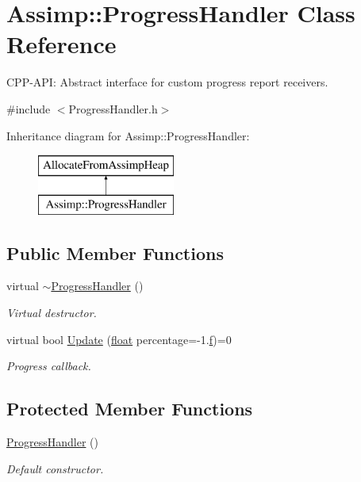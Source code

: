 \hypertarget{class_assimp_1_1_progress_handler}{\section{Assimp\-:\-:Progress\-Handler Class Reference}
\label{class_assimp_1_1_progress_handler}
}


C\-P\-P-\/\-A\-P\-I\-: Abstract interface for custom progress report receivers.  




{\ttfamily \#include $<$Progress\-Handler.\-h$>$}

Inheritance diagram for Assimp\-:\-:Progress\-Handler\-:\begin{figure}[H]
\begin{center}
\leavevmode
\includegraphics[height=2.000000cm]{class_assimp_1_1_progress_handler}
\end{center}
\end{figure}
\subsection*{Public Member Functions}
\begin{DoxyCompactItemize}
\item 
virtual \hyperlink{class_assimp_1_1_progress_handler_a3ec465a62e1feaae00f585ca0cffb81e}{$\sim$\-Progress\-Handler} ()
\begin{DoxyCompactList}\small\item\em Virtual destructor. \end{DoxyCompactList}\item 
virtual bool \hyperlink{class_assimp_1_1_progress_handler_ab08a1d300d434f6dd86ca41747cba448}{Update} (\hyperlink{fmod_8h_aeb841aa4b4b5f444b5d739d865b420af}{float} percentage=-\/1.\hyperlink{glew_8h_a691492ec0bd6383f91200e49f6ae40ed}{f})=0
\begin{DoxyCompactList}\small\item\em Progress callback. \end{DoxyCompactList}\end{DoxyCompactItemize}
\subsection*{Protected Member Functions}
\begin{DoxyCompactItemize}
\item 
\hyperlink{class_assimp_1_1_progress_handler_a53b192913e9904c674b851c46e1ea9e8}{Progress\-Handler} ()
\begin{DoxyCompactList}\small\item\em Default constructor. \end{DoxyCompactList}\end{DoxyCompactItemize}


